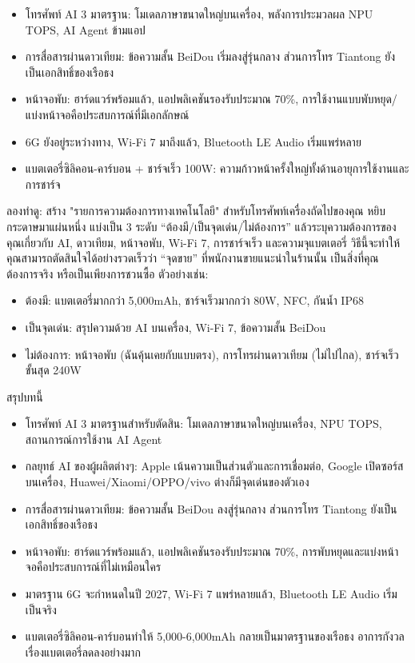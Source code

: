 
\begin{itemize}
  \item โทรศัพท์ AI 3 มาตรฐาน: โมเดลภาษาขนาดใหญ่บนเครื่อง, พลังการประมวลผล NPU TOPS, AI Agent ข้ามแอป
  \item การสื่อสารผ่านดาวเทียม: ข้อความสั้น BeiDou เริ่มลงสู่รุ่นกลาง ส่วนการโทร Tiantong ยังเป็นเอกสิทธิ์ของเรือธง
  \item หน้าจอพับ: ฮาร์ดแวร์พร้อมแล้ว, แอปพลิเคชันรองรับประมาณ 70\%, การใช้งานแบบพับหยุด/แบ่งหน้าจอคือประสบการณ์ที่มีเอกลักษณ์
  \item 6G ยังอยู่ระหว่างทาง, Wi-Fi 7 มาถึงแล้ว, Bluetooth LE Audio เริ่มแพร่หลาย
  \item แบตเตอรี่ซิลิคอน-คาร์บอน + ชาร์จเร็ว 100W: ความก้าวหน้าครั้งใหญ่ทั้งด้านอายุการใช้งานและการชาร์จ
\end{itemize}

\begin{tcbpractice}{ลองทำดู: สร้าง "รายการความต้องการทางเทคโนโลยี" สำหรับโทรศัพท์เครื่องถัดไปของคุณ}
หยิบกระดาษมาแผ่นหนึ่ง แบ่งเป็น 3 ระดับ “ต้องมี/เป็นจุดเด่น/ไม่ต้องการ” แล้วระบุความต้องการของคุณเกี่ยวกับ AI, ดาวเทียม, หน้าจอพับ, Wi-Fi 7, การชาร์จเร็ว และความจุแบตเตอรี่ วิธีนี้จะทำให้คุณสามารถตัดสินใจได้อย่างรวดเร็วว่า “จุดขาย” ที่พนักงานขายแนะนำในร้านนั้น เป็นสิ่งที่คุณต้องการจริง หรือเป็นเพียงการชวนซื้อ ตัวอย่างเช่น:

\begin{itemize}
  \item ต้องมี: แบตเตอรี่มากกว่า 5,000mAh, ชาร์จเร็วมากกว่า 80W, NFC, กันน้ำ IP68
  \item เป็นจุดเด่น: สรุปความด้วย AI บนเครื่อง, Wi-Fi 7, ข้อความสั้น BeiDou
  \item ไม่ต้องการ: หน้าจอพับ (ฉันคุ้นเคยกับแบบตรง), การโทรผ่านดาวเทียม (ไม่ไปไกล), ชาร์จเร็วขั้นสุด 240W
\end{itemize}

\end{tcbpractice}

\begin{tcbsummary}{สรุปบทนี้}
\begin{itemize}
  \item โทรศัพท์ AI 3 มาตรฐานสำหรับตัดสิน: โมเดลภาษาขนาดใหญ่บนเครื่อง, NPU TOPS, สถานการณ์การใช้งาน AI Agent
  \item กลยุทธ์ AI ของผู้ผลิตต่างๆ: Apple เน้นความเป็นส่วนตัวและการเชื่อมต่อ, Google เปิดซอร์สบนเครื่อง, Huawei/Xiaomi/OPPO/vivo ต่างก็มีจุดเด่นของตัวเอง
  \item การสื่อสารผ่านดาวเทียม: ข้อความสั้น BeiDou ลงสู่รุ่นกลาง ส่วนการโทร Tiantong ยังเป็นเอกสิทธิ์ของเรือธง
  \item หน้าจอพับ: ฮาร์ดแวร์พร้อมแล้ว, แอปพลิเคชันรองรับประมาณ 70\%, การพับหยุดและแบ่งหน้าจอคือประสบการณ์ที่ไม่เหมือนใคร
  \item มาตรฐาน 6G จะกำหนดในปี 2027, Wi-Fi 7 แพร่หลายแล้ว, Bluetooth LE Audio เริ่มเป็นจริง
  \item แบตเตอรี่ซิลิคอน-คาร์บอนทำให้ 5,000-6,000mAh กลายเป็นมาตรฐานของเรือธง อาการกังวลเรื่องแบตเตอรี่ลดลงอย่างมาก
\end{itemize}

\end{tcbsummary}

